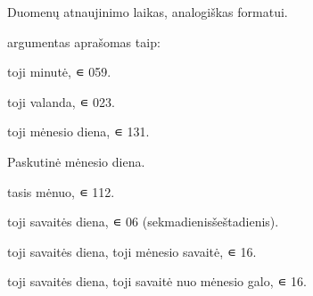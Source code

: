 \documentclass[letterpaper,10pt,lithuanian]{sphinxmanual}
\begin{document}
\begin{fulllineitems}

\pysigstartsignatures
\pysigline
{}
\pysigstopsignatures{}

\begin{fulllineitems}
\label{\detokenize{formules:cron}}
\pysigstartsignatures
\pysiglinewithargsret
{}
{}
{}
\pysigstopsignatures
\sphinxAtStartPar
Duomenų atnaujinimo laikas, analogiškas  formatui.

\sphinxAtStartPar
{} argumentas aprašomas taip:
\begin{description}
\sphinxAtStartPar
{}\sphinxhyphen{}toji minutė,  ∊ 0\sphinxhyphen{}59.

\sphinxAtStartPar
{}\sphinxhyphen{}toji valanda,  ∊ 0\sphinxhyphen{}23.

\sphinxAtStartPar
{}\sphinxhyphen{}toji mėnesio diena,  ∊ 1\sphinxhyphen{}31.

\sphinxAtStartPar
Paskutinė mėnesio diena.

\sphinxAtStartPar
{}\sphinxhyphen{}tasis mėnuo,  ∊ 1\sphinxhyphen{}12.

\sphinxAtStartPar
{}\sphinxhyphen{}toji savaitės diena,  ∊ 0\sphinxhyphen{}6 (sekmadienis\sphinxhyphen{}šeštadienis).

\sphinxAtStartPar
{}\sphinxhyphen{}toji savaitės diena, \sphinxhyphen{}toji mėnesio savaitė,  ∊ 1\sphinxhyphen{}6.

\sphinxAtStartPar
{}\sphinxhyphen{}toji savaitės diena, \sphinxhyphen{}toji savaitė nuo mėnesio galo, 
∊ 1\sphinxhyphen{}6.


\end{description}
\end{fulllineitems}
\end{fulllineitems}
\end{document}
